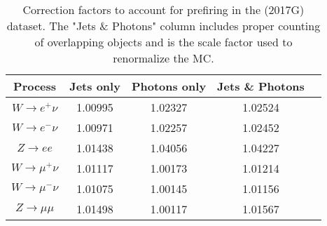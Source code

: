 \begin{table}[htbp]
\begin{center}
\begin{tabular}{|c|c|c|c|c|}
\hline
Process & Jets only & Photons only & Jets \& Photons \\\hline \hline
$W\rightarrow e^+\nu$      & 1.00995 & 1.02327 & 1.02524 \\
$W\rightarrow e^-\nu$      & 1.00971 & 1.02257 & 1.02452 \\
$Z\rightarrow ee$          & 1.01438 & 1.04056 & 1.04227 \\
\hline
$W\rightarrow \mu^+\nu$   & 1.01117 & 1.00173 & 1.01214 \\
$W\rightarrow \mu^-\nu$   & 1.01075 & 1.00145 &  1.01156\\
$Z\rightarrow \mu\mu$     & 1.01498 & 1.00117 & 1.01567 \\
\hline
\end{tabular} 
\end{center}


\caption{Correction factors to account for prefiring in the \sg (2017G) dataset. The "Jets \& Photons" column includes proper counting of overlapping objects and is the scale factor used to renormalize the MC.}
\label{tab:prefire:5}
\end{table}
